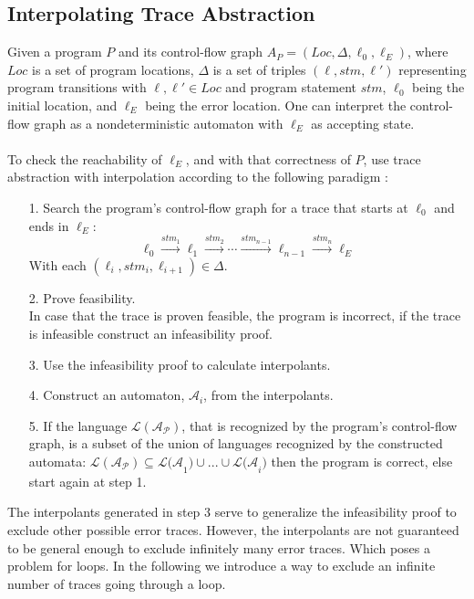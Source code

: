 \documentclass{article}
\begin{document}
\subsection{Interpolating Trace Abstraction}
Given a program $P$ and its control-flow graph $A_P = (Loc, \Delta, \ell_{0}, \ell_E)$, where $Loc$ is a set of program locations, $\Delta$ is a set of triples $(\ell, stm, \ell')$ representing program transitions with $\ell, \ell' \in Loc$ and program statement $stm$, $\ell_{0}$ being the initial location, and $\ell_E$ being the error location. One can interpret the control-flow graph as a nondeterministic automaton with $\ell_E$ as accepting state. \\ \\ To check the reachability of $\ell_E$, and with that correctness of $P$, use trace abstraction with interpolation according to the following paradigm \cite{10.1007/978-3-642-03237-0_7}:
\begin{itemize}
	\item[1.] Search the program's control-flow graph for a trace that starts at $\ell_0$ and ends in $\ell_E$:
	\begin{equation*}
			 \ell_{0} \xrightarrow{\text{$stm_1$}} \ell_1 \xrightarrow{\text{$stm_2$}} \cdots \xrightarrow{\text{$stm_{n-1}$}} \ell_{n-1} \xrightarrow{\text{$stm_{n}$}} \ell_{E}
	\end{equation*}
	With each $(\ell_i, stm_i, \ell_{i + 1}) \in \Delta$.
	\item[2.] Prove feasibility. \\ In case that the trace is proven feasible, the program is incorrect, if the trace is infeasible construct an infeasibility proof.
	\item[3.] Use the infeasibility proof to calculate interpolants.
	\item[4.] Construct an automaton, $\mathcal{A}_i$, from the interpolants.
	\item[5.] If the language $\mathcal{L(A_P)}$, that is recognized by the program's control-flow graph, is a subset of the union of languages recognized by the constructed automata: $\mathcal{L(A_P)} \subseteq \mathcal{L(A}_1) \cup ... \cup \mathcal{L(A}_i)$ then the program is correct, else start again at step 1.
\end{itemize}
The interpolants generated in step 3 serve to generalize the infeasibility proof to exclude other possible error traces. However, the interpolants are not guaranteed to be general enough to exclude infinitely many error traces. Which poses a problem for loops. In the following we introduce a way to exclude an infinite number of traces going through a loop.
\end{document}
